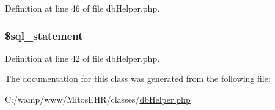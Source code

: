 \-Definition at line 46 of file db\-Helper.\-php.

\hypertarget{classdb_helper_a29c1e591b4e284bca5ae38ed00eea5a9}{
\subsubsection[{\$sql\-\_\-statement}]{\setlength{\rightskip}{0pt plus 5cm}\$sql\-\_\-statement}}\label{classdb_helper_a29c1e591b4e284bca5ae38ed00eea5a9}


\-Definition at line 42 of file db\-Helper.\-php.



\-The documentation for this class was generated from the following file\-:\begin{DoxyCompactItemize}
\item 
\-C\-:/wamp/www/\-Mitos\-E\-H\-R/classes/\hyperlink{db_helper_8php}{db\-Helper.\-php}\end{DoxyCompactItemize}
